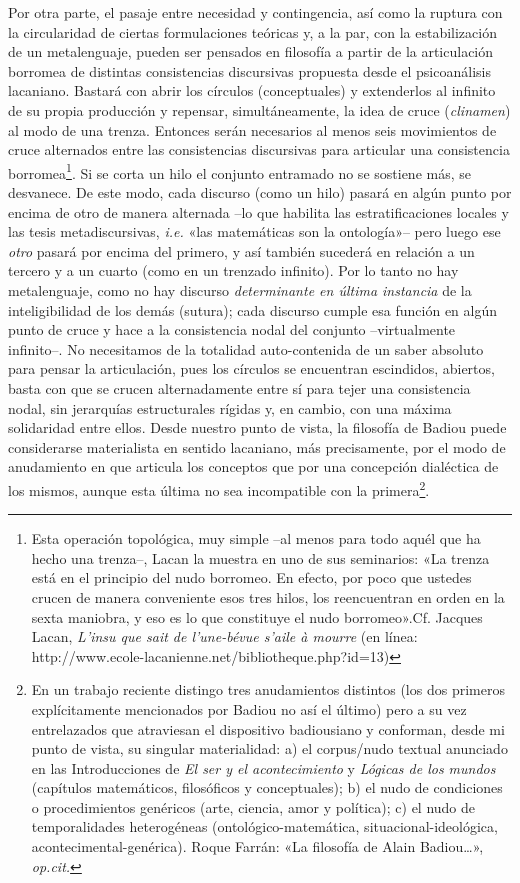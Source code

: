 Por otra parte, el pasaje entre necesidad y contingencia, así como la ruptura con la circularidad de ciertas formulaciones teóricas y, a la par, con la estabilización de un metalenguaje, pueden ser pensados en filosofía a partir de la articulación borromea de distintas consistencias discursivas propuesta desde el psicoanálisis lacaniano. Bastará con abrir los círculos (conceptuales) y extenderlos al infinito de su propia producción y repensar, simultáneamente, la idea de cruce (\emph{clinamen}) al modo de una trenza. Entonces serán necesarios al menos seis movimientos de cruce alternados entre las consistencias discursivas para articular una consistencia borromea\footnote{Esta operación topológica, muy simple --al menos para todo aquél que ha hecho una trenza--, Lacan la muestra en uno de sus seminarios: «La trenza está en el principio del nudo borromeo. En efecto, por poco que ustedes crucen de manera conveniente esos tres hilos, los reencuentran en orden en la sexta maniobra, y eso es lo que constituye el nudo borromeo».Cf. Jacques Lacan, \emph{L'insu que sait de l'une-bévue s'aile à mourre} (en línea: http://www.ecole-lacanienne.net/bibliotheque.php?id=13)}. Si se corta un hilo el conjunto entramado no se sostiene más, se desvanece. De este modo, cada discurso (como un hilo) pasará en algún punto por encima de otro de manera alternada --lo que habilita las estratificaciones locales y las tesis metadiscursivas, \emph{i.e.} «las matemáticas son la ontología»-- pero luego ese \emph{otro} pasará por encima del primero, y así también sucederá en relación a un tercero y a un cuarto (como en un trenzado infinito). Por lo tanto no hay metalenguaje, como no hay discurso \emph{determinante en última instancia} de la inteligibilidad de los demás (sutura); cada discurso cumple esa función en algún punto de cruce y hace a la consistencia nodal del conjunto --virtualmente infinito--. No necesitamos de la totalidad auto-contenida de un saber absoluto para pensar la articulación, pues los círculos se encuentran escindidos, abiertos, basta con que se crucen alternadamente entre sí para tejer una consistencia nodal, sin jerarquías estructurales rígidas y, en cambio, con una máxima solidaridad entre ellos. Desde nuestro punto de vista, la filosofía de Badiou puede considerarse materialista en sentido lacaniano, más precisamente, por el modo de anudamiento en que articula los conceptos que por una concepción dialéctica de los mismos, aunque esta última no sea incompatible con la primera\footnote{En un trabajo reciente distingo tres anudamientos distintos (los dos primeros explícitamente mencionados por Badiou no así el último) pero a su vez entrelazados que atraviesan el dispositivo badiousiano y conforman, desde mi punto de vista, su singular materialidad: a) el corpus/nudo textual anunciado en las Introducciones de \emph{El ser y el acontecimiento} y \emph{Lógicas de los mundos} (capítulos matemáticos, filosóficos y conceptuales); b) el nudo de condiciones o procedimientos genéricos (arte, ciencia, amor y política); c) el nudo de temporalidades heterogéneas (ontológico-matemática, situacional-ideológica, acontecimental-genérica). Roque Farrán: «La filosofía de Alain Badiou\ldots», \emph{op.cit.}}.

